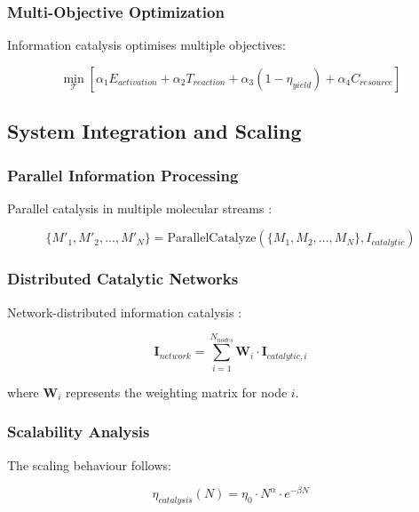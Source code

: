 \documentclass[12pt,a4paper]{article}
\begin{document}
\subsubsection{Multi-Objective Optimization}

Information catalysis optimises multiple objectives:

\begin{equation}
\min_{\mathcal{T}} \left[ \alpha_1 E_{activation} + \alpha_2 T_{reaction} + \alpha_3 (1 - \eta_{yield}) + \alpha_4 C_{resource} \right]
\end{equation}

\subsection{System Integration and Scaling}

\subsubsection{Parallel Information Processing}

Parallel catalysis in multiple molecular streams \cite{kumar1994introduction}:

\begin{equation}
\{M'_1, M'_2, ..., M'_N\} = \text{ParallelCatalyze}(\{M_1, M_2, ..., M_N\}, I_{catalytic})
\end{equation}

\subsubsection{Distributed Catalytic Networks}

Network-distributed information catalysis \cite{tanenbaum2002distributed}:

\begin{equation}
\mathbf{I}_{network} = \sum_{i=1}^{N_{nodes}} \mathbf{W}_i \cdot \mathbf{I}_{catalytic,i}
\end{equation}

where $\mathbf{W}_i$ represents the weighting matrix for node $i$.

\subsubsection{Scalability Analysis}

The scaling behaviour follows:

\begin{equation}
\eta_{catalysis}(N) = \eta_0 \cdot N^{\alpha} \cdot e^{-\beta N}
\end{equation}
\end{document}
